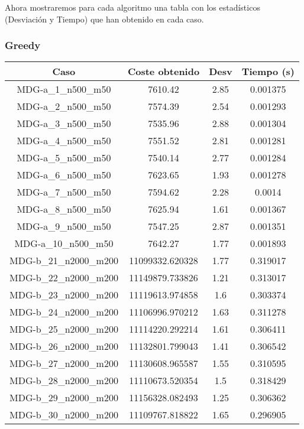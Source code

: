 \documentclass{article}
\begin{document}
Ahora mostraremos para cada algoritmo una tabla con los estadísticos (Desviación y Tiempo) que han obtenido en cada
caso.

\pagebreak

\subsubsection*{Greedy}

\begin{table}[H]
	\centering
	\begin{tabular}{|cccc|}
		\hline
		Caso & Coste obtenido & Desv & Tiempo (s)\\ \hline
		MDG-a\_1\_n500\_m50 & 7610.42 & 2.85 & 0.001375\\
		MDG-a\_2\_n500\_m50 & 7574.39 & 2.54 & 0.001293\\
		MDG-a\_3\_n500\_m50 & 7535.96 & 2.88 & 0.001304\\
		MDG-a\_4\_n500\_m50 & 7551.52 & 2.81 & 0.001281\\
		MDG-a\_5\_n500\_m50 & 7540.14 & 2.77 & 0.001284\\
		MDG-a\_6\_n500\_m50 & 7623.65 & 1.93 & 0.001278\\
		MDG-a\_7\_n500\_m50 & 7594.62 & 2.28 & 0.0014\\
		MDG-a\_8\_n500\_m50 & 7625.94 & 1.61 & 0.001367\\
		MDG-a\_9\_n500\_m50 & 7547.25 & 2.87 & 0.001351\\
		MDG-a\_10\_n500\_m50 & 7642.27 & 1.77 & 0.001893\\
		MDG-b\_21\_n2000\_m200 & 11099332.620328 & 1.77 & 0.319017\\
		MDG-b\_22\_n2000\_m200 & 11149879.733826 & 1.21 & 0.313017\\
		MDG-b\_23\_n2000\_m200 & 11119613.974858 & 1.6 & 0.303374\\
		MDG-b\_24\_n2000\_m200 & 11106996.970212 & 1.63 & 0.311278\\
		MDG-b\_25\_n2000\_m200 & 11114220.292214 & 1.61 & 0.306411\\
		MDG-b\_26\_n2000\_m200 & 11132801.799043 & 1.41 & 0.306542\\
		MDG-b\_27\_n2000\_m200 & 11130608.965587 & 1.55 & 0.310595\\
		MDG-b\_28\_n2000\_m200 & 11110673.520354 & 1.5 & 0.318429\\
		MDG-b\_29\_n2000\_m200 & 11156328.082493 & 1.25 & 0.306362\\
		MDG-b\_30\_n2000\_m200 & 11109767.818822 & 1.65 & 0.296905\\

\end{tabular}
\end{table}
\end{document}
